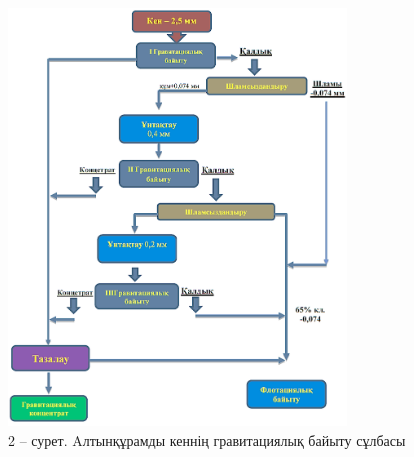 



\begin{figure}[H]
	\centering
	\includegraphics[width=0.8\textwidth]{media/gor/image4}
	\caption*{2 -- сурет. Aлтынқұрамды кеннің гравитациялық байыту сұлбасы}
\end{figure}


